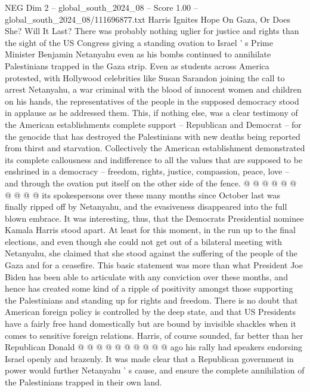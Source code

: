 \begin{textsample}{NEG Dim 2 – global\_south\_2024\_08 – Score 1.00 – global\_south\_2024\_08/111696877.txt}  \label{ex:f2_neg_426}
Harris Ignites Hope On Gaza, Or Does She?
Will It Last?
There was probably nothing uglier for justice and rights than the sight of the US Congress giving a standing ovation to Israel ' s Prime Minister Benjamin Netanyahu even as his bombs continued to annihilate Palestinians trapped in the Gaza strip.
Even as students across America protested, with Hollywood celebrities like Susan Sarandon joining the call to arrest Netanyahu, a war criminal with the blood of innocent women and children on his hands, the representatives of the people in the supposed democracy stood in applause as he addressed them.
This, if nothing else, was a clear testimony of the American establishments complete support -- Republican and Democrat -- for the genocide that has destroyed the Palestinians with new deaths being reported from thirst and starvation.
Collectively the American establishment demonstrated its complete callousness and indifference to all the values that are supposed to be enshrined in a democracy -- freedom, rights, justice, compassion, peace, love -- and through the ovation put itself on the other side of the fence. @ @ @ @ @ @ @ @ @ @ its spokespersons over these many months since October last was finally ripped off by Netanyahu, and the evasiveness disappeared into the full blown embrace.
It was interesting, thus, that the Democrats Presidential nominee Kamala Harris stood apart.
At least for this moment, in the run up to the final elections, and even though she could not get out of a bilateral meeting with Netanyahu, she claimed that she stood against the suffering of the people of the Gaza and for a ceasefire.
This basic statement was more than what President Joe Biden has been able to articulate with any conviction over these months, and hence has created some kind of a ripple of positivity amongst those supporting the Palestinians and standing up for rights and freedom.
There is no doubt that American foreign policy is controlled by the deep state, and that US Presidents have a fairly free hand domestically but are bound by invisible shackles when it comes to sensitive foreign relations.
Harris, of course sounded, far better than her Republican Donald @ @ @ @ @ @ @ @ @ @ ago his rally had speakers endorsing Israel openly and brazenly.
It was made clear that a Republican government in power would further Netanyahu ' s cause, and ensure the complete annihilation of the Palestinians trapped in their own land.

\end{textsample}
